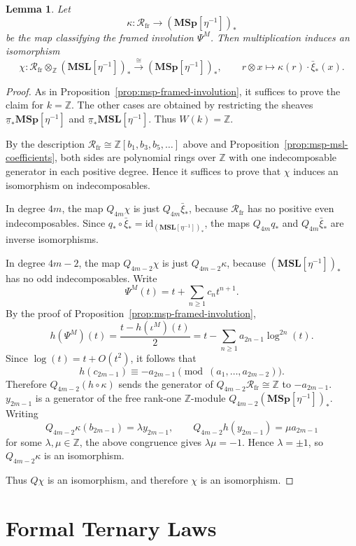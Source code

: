 \documentclass[a4paper]{amsart}
\theoremstyle{plain}
\newtheorem{lemma}[subsubsection]{Lemma}
\theoremstyle{definition}
\newcommand{\MSp}{\mathbf{MSp}}
\newcommand{\MSL}{\mathbf{MSL}}
\newcommand{\etainv}{\eta^{-1}}
\newcommand{\MSpetainv}{{\MSp[\etainv]}}
\newcommand{\MSLetainv}{{\MSL[\etainv]}}
\newcommand{\ZZ}{\mathbb{Z}}
\newcommand{\Rfr}{\mathcal{R}_{\mathrm{fr}}}
\renewcommand{\ge}{\geqslant}
\begin{document}
\begin{lemma}\label{lem:canonical-msp-splitting}
	Let
	\[
		\kappa:\Rfr\longrightarrow (\MSpetainv)_*
	\]
	be the map classifying the framed involution $\Psi^M$. Then multiplication induces an isomorphism
	\[
		\chi:\Rfr\otimes_{\ZZ}(\MSLetainv)_*\xrightarrow{\cong}(\MSpetainv)_*,
		\qquad
		r\otimes x\longmapsto \kappa(r)\cdot \bar{\xi}_*(x).
	\]
\end{lemma}
\begin{proof}
	As in Proposition~\ref{prop:msp-framed-involution}, it suffices to prove the claim for $k=\ZZ$. The other cases are obtained by restricting the sheaves $\underline{\pi}_*\MSpetainv$ and $\underline{\pi}_*\MSLetainv$. Thus $W(k)=\ZZ$.

	By the description $\Rfr\cong \ZZ[b_1,b_3,b_5,\ldots]$ above and Proposition~\ref{prop:msp-msl-coefficients}, both sides are polynomial rings over $\ZZ$ with one indecomposable generator in each positive degree. Hence it suffices to prove that $\chi$ induces an isomorphism on indecomposables.

	In degree $4m$, the map $Q_{4m}\chi$ is just $Q_{4m}\bar{\xi}_*$, because $\Rfr$ has no positive even indecomposables. Since $q_*\circ \bar{\xi}_*=\mathrm{id}_{(\MSLetainv)_*}$, the maps $Q_{4m}q_*$ and $Q_{4m}\bar{\xi}_*$ are inverse isomorphisms.

	In degree $4m-2$, the map $Q_{4m-2}\chi$ is just $Q_{4m-2}\kappa$, because $(\MSLetainv)_*$ has no odd indecomposables. Write
	\[
		\Psi^M(t)=t+\sum_{n\ge 1} c_n t^{n+1}.
	\]
	By the proof of Proposition~\ref{prop:msp-framed-involution},
	\[
		h(\Psi^M)(t) = \frac{t-h(\iota^M)(t)}{2} = t-\sum_{n\ge 1}a_{2n-1}\log^{2n}(t).
	\]
	Since $\log(t)=t+O(t^2)$, it follows that
	\[
		h(c_{2m-1})\equiv -a_{2m-1}\pmod{(a_1,\ldots,a_{2m-2})}.
	\]
	Therefore $Q_{4m-2}(h\circ \kappa)$ sends the generator of $Q_{4m-2}\Rfr\cong \ZZ$ to $-a_{2m-1}$. $y_{2m-1}$ is a generator of the free rank-one $\ZZ$-module $Q_{4m-2}(\MSpetainv)_*$. Writing
	\[
		Q_{4m-2}\kappa(b_{2m-1})=\lambda y_{2m-1},\qquad
		Q_{4m-2}h(y_{2m-1})=\mu a_{2m-1}
	\]
	for some $\lambda,\mu\in \ZZ$, the above congruence gives $\lambda\mu=-1$. Hence $\lambda=\pm 1$, so $Q_{4m-2}\kappa$ is an isomorphism.

	Thus $Q\chi$ is an isomorphism, and therefore $\chi$ is an isomorphism.
\end{proof}

\section{Formal Ternary Laws}\label{sec:formal-ternary-law}
\end{document}
